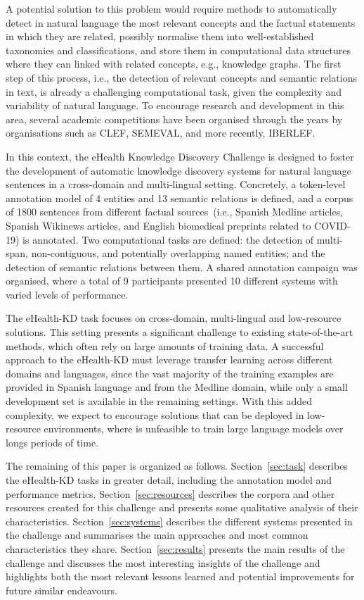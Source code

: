 \documentclass[a4paper,11pt,twocolumn,twoside]{article}
\begin{document}
A potential solution to this problem would require methods to automatically detect in natural language the most relevant concepts and the factual statements in which they are related, possibly normalise them into well-established taxonomies and classifications, and store them in computational data structures where they can linked with related concepts, e.g., knowledge graphs.
The first step of this process, i.e., the detection of relevant concepts and semantic relations in text, is already a challenging computational task, given the complexity and variability of natural language.
To encourage research and development in this area, several academic competitions have been organised through the years by organisations such as CLEF, SEMEVAL, and more recently, IBERLEF.

In this context, the eHealth Knowledge Discovery Challenge is designed to foster the development of automatic knowledge discovery systems for natural language sentences in a cross-domain and multi-lingual setting.
Concretely, a token-level annotation model of 4 entities and 13 semantic relations is defined, and a corpus of 1800 sentences from different factual sources~(i.e., Spanish Medline articles, Spanish Wikinews articles, and English biomedical preprints related to COVID-19) is annotated.
Two computational tasks are defined: the detection of multi-span, non-contiguous, and potentially overlapping named entities; and the detection of semantic relations between them.
A shared annotation campaign was organised, where a total of 9 participants presented 10 different systems with varied levels of performance.

The eHealth-KD task focuses on cross-domain, multi-lingual and low-resource solutions. This setting presents a significant challenge to existing state-of-the-art methods, which often rely on large amounts of training data.
A successful approach to the eHealth-KD must leverage transfer learning across different domains and languages, since the vast majority of the training examples are provided in Spanish language and from the Medline domain, while only a small development set is available in the remaining settings.
With this added complexity, we expect to encourage solutions that can be deployed in low-resource environments, where is unfeasible to train large language models over longs periods of time.

The remaining of this paper is organized as follows.
Section~\ref{sec:task} describes the eHealth-KD tasks in greater detail, including the annotation model and performance metrics.
Section~\ref{sec:resources} describes the corpora and other resources created for this challenge and presents some qualitative analysis of their characteristics.
Section~\ref{sec:systems} describes the different systems presented in the challenge and summarises the main approaches and most common characteristics they share.
Section~\ref{sec:results} presents the main results of the challenge and discusses the most interesting insights of the challenge and highlights both the most relevant lessons learned and potential improvements for future similar endeavours.
\end{document}
